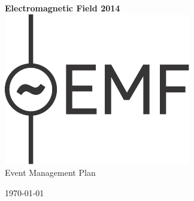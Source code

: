 

\newcommand{\st}{\superscript{st} }
\newcommand{\nd}{\superscript{nd} }
\renewcommand{\th}{\superscript{th} }



\begin{titlepage}
\begin{center}
{\bf \LARGE Electromagnetic Field 2014}\\[36pt]
\includegraphics{emf-logo.pdf}\\[48pt]
{\Large Event Management Plan}

\vfill
\today

\end{center}
\end{titlepage}




